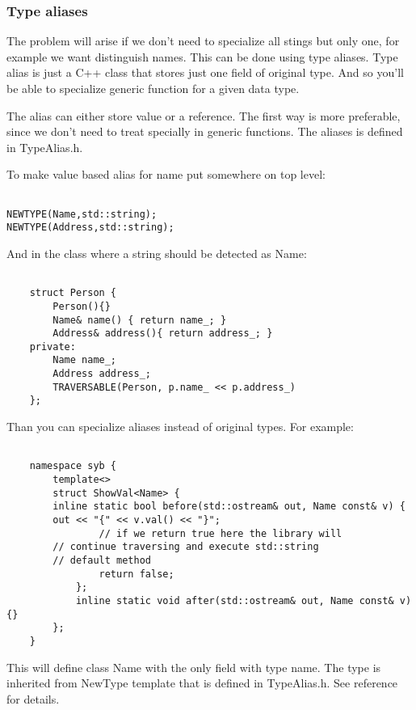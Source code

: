 \documentclass[a4paper]{article}
\begin{document}
\subsubsection{Type aliases}

The problem will arise if we don't need to specialize all stings but only one, for example 
we want distinguish names. This can be done using type aliases. Type alias is just a C++
class that stores just one field of original type. And so you'll be able to specialize 
generic function for a given data type.

The alias can either store value or a reference. The first way is more preferable, since we
don't need to treat specially in generic functions. The aliases is defined in TypeAlias.h.

To make value based alias for name put somewhere on top level:

\begin{lstlisting}

NEWTYPE(Name,std::string);
NEWTYPE(Address,std::string);

\end{lstlisting}

And in the class where a string should be detected as Name:

\begin{lstlisting}

	struct Person {
		Person(){}
		Name& name() { return name_; }
		Address& address(){ return address_; }
	private:
		Name name_;
		Address address_;
		TRAVERSABLE(Person, p.name_ << p.address_)
	};

\end{lstlisting}

Than you can specialize aliases instead of original types. For example:

\begin{lstlisting}

	namespace syb {
		template<>
		struct ShowVal<Name> {
  		inline static bool before(std::ostream& out, Name const& v) {
        out << "{" << v.val() << "}";
				// if we return true here the library will 
        // continue traversing and execute std::string 
        // default method 
				return false;
			};
			inline static void after(std::ostream& out, Name const& v) {}
		};
	}

\end{lstlisting}

This will define class Name with the only field with type name. The type is inherited from
NewType template that is defined in TypeAlias.h. See reference for details. 
\end{document}
